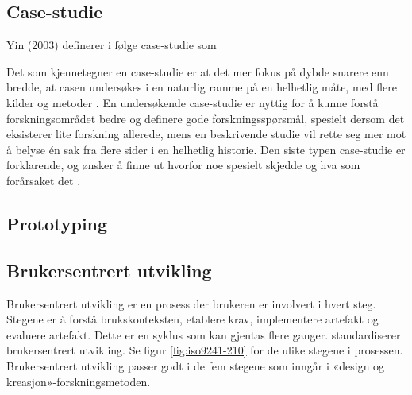 \subsection{Case-studie}
Yin (2003) definerer i følge \citet{oates} case-studie som 

Det som kjennetegner en case-studie er at det mer fokus på dybde snarere enn bredde,
at casen undersøkes i en naturlig ramme på en helhetlig måte, med flere kilder og metoder \citep[s. 142]{oates}. En undersøkende case-studie er nyttig for å kunne forstå
forskningsområdet bedre og definere gode forskningsspørsmål,
spesielt dersom det eksisterer lite forskning allerede, mens en beskrivende studie vil rette seg mer
mot å belyse én sak fra flere sider i en helhetlig historie. Den siste typen
case-studie er forklarende, og ønsker å finne ut hvorfor noe spesielt skjedde og hva
som forårsaket det \citep[s. 143]{oates}.
    
\subsection{Prototyping}

\subsection{Brukersentrert utvikling}
Brukersentrert utvikling er en prosess der brukeren er involvert i hvert steg.
Stegene er å forstå brukskonteksten, etablere krav, implementere artefakt og evaluere artefakt. Dette er en syklus som kan gjentas flere ganger.
\citet{dis20099241} standardiserer brukersentrert utvikling. Se figur \ref{fig:iso9241-210}
for de ulike stegene i prosessen.
Brukersentrert utvikling passer godt i de fem stegene som inngår i «design og kreasjon»-forskningsmetoden.

